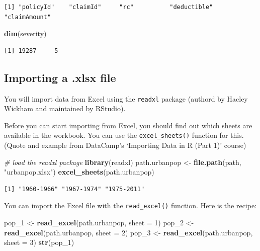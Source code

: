 \documentclass[
]{book}
\newenvironment{Shaded}{\begin{snugshade}}{\end{snugshade}}
\newcommand{\CommentTok}[1]{\textcolor[rgb]{0.56,0.35,0.01}{\textit{#1}}}
\newcommand{\DataTypeTok}[1]{\textcolor[rgb]{0.13,0.29,0.53}{#1}}
\newcommand{\DecValTok}[1]{\textcolor[rgb]{0.00,0.00,0.81}{#1}}
\newcommand{\KeywordTok}[1]{\textcolor[rgb]{0.13,0.29,0.53}{\textbf{#1}}}
\newcommand{\NormalTok}[1]{#1}
\newcommand{\StringTok}[1]{\textcolor[rgb]{0.31,0.60,0.02}{#1}}
\begin{document}
\begin{verbatim}
[1] "policyId"    "claimId"     "rc"          "deductible"  "claimAmount"
\end{verbatim}

\begin{Shaded}
\begin{Highlighting}[]
\KeywordTok{dim}\NormalTok{(severity)}
\end{Highlighting}
\end{Shaded}

\begin{verbatim}
[1] 19287     5
\end{verbatim}

\hypertarget{importing-a-.xlsx-file}{%
\subsection{Importing a .xlsx file}\label{importing-a-.xlsx-file}}

You will import data from Excel using the \texttt{readxl} package (authord by Hacley Wickham and maintained by RStudio).

Before you can start importing from Excel, you should find out which sheets are available in the workbook. You can use the \texttt{excel\_sheets()} function for this. (Quote and example from DataCamp's `Importing Data in R (Part 1)' course)

\begin{Shaded}
\begin{Highlighting}[]
\CommentTok{# load the readxl package}
\KeywordTok{library}\NormalTok{(readxl)}
\NormalTok{path.urbanpop <-}\StringTok{ }\KeywordTok{file.path}\NormalTok{(path, }\StringTok{"urbanpop.xlsx"}\NormalTok{)}
\KeywordTok{excel_sheets}\NormalTok{(path.urbanpop)}
\end{Highlighting}
\end{Shaded}

\begin{verbatim}
[1] "1960-1966" "1967-1974" "1975-2011"
\end{verbatim}

You can import the Excel file with the \texttt{read\_excel()} function. Here is the recipe:

\begin{Shaded}
\begin{Highlighting}[]
\NormalTok{pop_}\DecValTok{1}\NormalTok{ <-}\StringTok{ }\KeywordTok{read_excel}\NormalTok{(path.urbanpop, }\DataTypeTok{sheet =} \DecValTok{1}\NormalTok{)}
\NormalTok{pop_}\DecValTok{2}\NormalTok{ <-}\StringTok{ }\KeywordTok{read_excel}\NormalTok{(path.urbanpop, }\DataTypeTok{sheet =} \DecValTok{2}\NormalTok{)}
\NormalTok{pop_}\DecValTok{3}\NormalTok{ <-}\StringTok{ }\KeywordTok{read_excel}\NormalTok{(path.urbanpop, }\DataTypeTok{sheet =} \DecValTok{3}\NormalTok{)}
\KeywordTok{str}\NormalTok{(pop_}\DecValTok{1}\NormalTok{)}
\end{Highlighting}
\end{Shaded}
\end{document}
